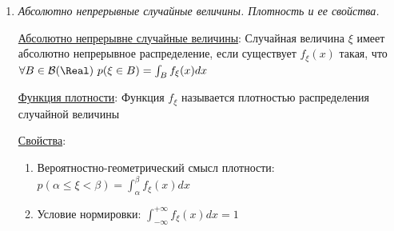 \begin{enumerate}
\begin{enumerate}
        \item $F(x)$ неубывающая функция: $x_1 < x_2 \Longrightarrow F(x_1) \leq F(x_2)$ 

        \item $p(\alpha \leq \xi < \beta) = F(\beta) - F(\alpha)$

        \item $\lim_{x \to -\infty} F(x) = 0; \quad \lim_{x \to +\infty} F(x) = 1$

        \item $F(x)$ непрерывна слева: $F(x_0 - 0) = F(x_0)$

        \item Скачок в точке $x_0$ равен вероятности попадания в данную точку: $F(x_0 + 0) - F(x_0) = p(\xi = x_0)$ или $F(x_0 + 0) = p(\xi = x_0) + p(\xi < x_0) = p(\xi \leq x_0)$

        \item Если функция распределения непрерывна в точке $x = x_0$, то очевидно, что вероятность попадания в эту точка $p(\xi = x_0) = 0$ (следствие из 6 пункта)
        
        \item Если $F(x)$ непрерывна $\forall x \in \Real$, то $p(\alpha \leq \xi < \beta) = p(\alpha < \xi < \beta) = p(\alpha \leq \xi \leq \beta) = p(\alpha < \xi \leq \beta) = F(\beta) - F(\alpha)$
    \end{enumerate}
    
    \item \textit{Абсолютно непрерывные случайные величины. Плотность и ее свойства.}

    \hyperlink{continuousdistributionproperties}{Абсолютно непрерывне случайные величины}: Случайная величина $\xi$ имеет абсолютно непрерывное распределение, если существует $f_\xi(x)$ такая, что $\forall B \in \mathcal{B}(\Real)
    \ p(\xi \in B) = \int_B f_\xi(x)dx$

    \hyperlink{densityfunctiondefinition}{Функция плотности}: Функция $f_\xi$ называется плотностью распределения случайной величины

    \hyperlink{densityfunctionproperties}{Свойства}:

    \begin{enumerate}
        \item Вероятностно-геометрический смысл плотности: $p(\alpha \leq \xi < \beta) = \int_{\alpha}^\beta f_\xi(x) dx$

        \item Условие нормировки: $\int_{-\infty}^{+\infty} f_\xi(x)dx = 1$


\end{enumerate}
\end{enumerate}
